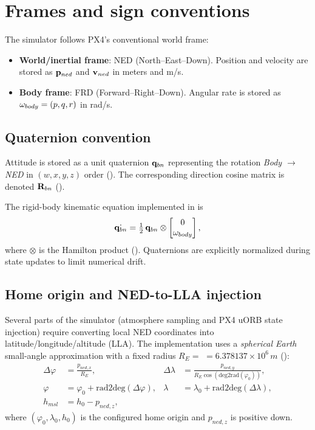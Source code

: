 \section{Frames and sign conventions}
\label{sec:frames}

The simulator follows PX4's conventional world frame:
\begin{itemize}[leftmargin=*,itemsep=2pt]
  \item \textbf{World/inertial frame}: NED (North--East--Down). Position and velocity are stored as $\mathbf{p}_{ned}$ and $\mathbf{v}_{ned}$ in meters and m/s.
  \item \textbf{Body frame}: FRD (Forward--Right--Down). Angular rate is stored as $\mathbf{\omega}_{body}=(p,q,r)$ in rad/s.
\end{itemize}

\subsection{Quaternion convention}

Attitude is stored as a unit quaternion \(\mathbf{q}_{bn}\) representing the rotation \emph{Body $\to$ NED} in $(w,x,y,z)$ order (). The corresponding direction cosine matrix is denoted \(\mathbf{R}_{bn}\) ().

The rigid-body kinematic equation implemented in  is
\begin{equation}
  \dot{\mathbf{q}_{bn}} = \tfrac{1}{2}\,\mathbf{q}_{bn} \otimes \begin{bmatrix}0 \\ \mathbf{\omega}_{body}\end{bmatrix},
\end{equation}
where $\otimes$ is the Hamilton product (). Quaternions are explicitly normalized during state updates to limit numerical drift.


\subsection{Home origin and NED-to-LLA injection}
\label{sec:home-origin}

Several parts of the simulator (atmosphere sampling and PX4 uORB state injection) require converting local NED coordinates into latitude/longitude/altitude (LLA). The implementation uses a \emph{spherical Earth} small-angle approximation with a fixed radius \(R_E=\)  \(=6.378137\times 10^6\,\si{m}\) ():
\begin{align}
  \Delta\varphi &= \frac{p_{ned,x}}{R_E}, &
  \Delta\lambda &= \frac{p_{ned,y}}{R_E\cos(\mathrm{deg2rad}(\varphi_0))},\\
  \varphi &= \varphi_0 + \mathrm{rad2deg}(\Delta\varphi), &
  \lambda &= \lambda_0 + \mathrm{rad2deg}(\Delta\lambda),\\
  h_{msl} &= h_0 - p_{ned,z},
\end{align}
where \((\varphi_0,\lambda_0,h_0)\) is the configured home origin and \(p_{ned,z}\) is positive down.

